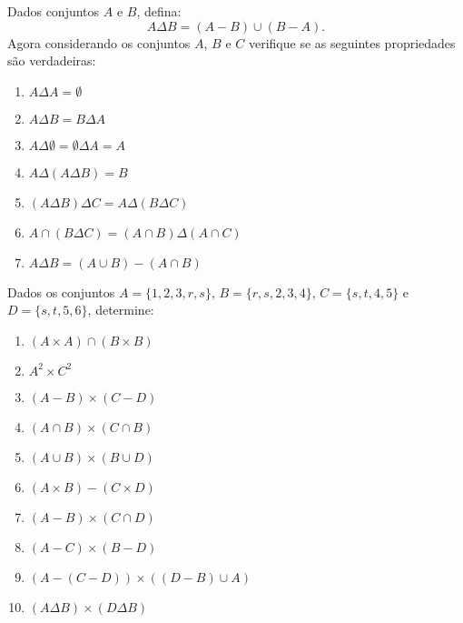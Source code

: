 \documentclass[12pt]{exam}
\begin{document}
\questao{} Dados conjuntos $A$ e $B$, defina:
\[
    A \Delta B = (A - B) \cup (B - A).
\]
Agora considerando os conjuntos $A$, $B$ e $C$ verifique se as seguintes propriedades s\~ao verdadeiras:
\begin{multicols}{2}
    \begin{enumerate}[label={\alph*})]
    \item $A \Delta A = \emptyset$
    \item $A \Delta B = B \Delta A$
    \item $A \Delta \emptyset = \emptyset \Delta A = A$
    \item $A \Delta (A \Delta B) = B$
    \item $(A \Delta B) \Delta C = A \Delta (B \Delta C)$
    \item $A \cap (B \Delta C) = (A \cap B) \Delta (A \cap C)$
    \item $A \Delta B = (A \cup B) - (A \cap B)$
\end{enumerate}
\end{multicols}

\questao{} Dados os conjuntos $A = \{1, 2, 3, r, s\}$, $B = \{r, s, 2, 3, 4\}$, $C = \{s, t, 4, 5\}$ e $D = \{s, t, 5, 6\}$, determine:
\begin{multicols}{2}
    \begin{enumerate}[label={\alph*})]
        \item $(A \times A) \cap (B \times B)$
        \item $A^2 \times C^2$
        \item $(A - B) \times (C - D)$
        \item $(A \cap B) \times (C \cap B)$
        \item $(A \cup B) \times (B \cup D)$
        \item $(A \times B) - (C \times D)$
        \item $(A - B) \times (C \cap D)$
        \item $(A - C) \times (B - D)$
        \item $(A - (C - D)) \times ((D - B) \cup A)$
        \item $(A \Delta B) \times (D \Delta B)$
    \end{enumerate}

\end{multicols}
\end{document}
